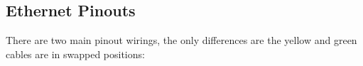 \subsection{Ethernet Pinouts}
There are two main pinout wirings, the only differences are the yellow and green cables are in swapped positions:
\\ 

